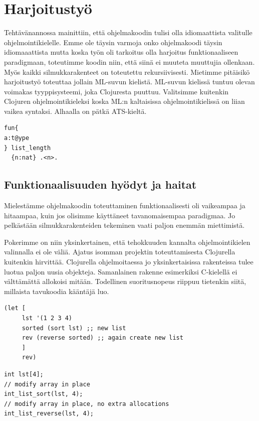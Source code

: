 \documentclass[12pt]{article}
\begin{document}
\newpage
\section{Harjoitustyö}
Tehtävänannossa mainittiin, että ohjelmakoodin tulisi olla idiomaattista valitulle ohjelmointikielelle.
Emme ole täysin varmoja onko ohjelmakoodi täysin idiomaaattista mutta koska työn oli tarkoitus olla harjoitus funktionaaliseen paradigmaan,
toteutimme koodin niin, että siinä ei muuteta muuttujia ollenkaan. Myös kaikki silmukkarakenteet on toteutettu rekursiivisesti.
Mietimme pitäisikö harjoitustyö toteuttaa jollain ML-suvun kielistä. ML-suvun kielissä tuntuu olevan voimakas tyyppisysteemi, joka Clojuresta puuttuu. Valitsimme kuitenkin Clojuren ohjelmointikieleksi koska ML:n kaltaisissa ohjelmointikielissä on liian vaikea syntaksi. Alhaalla on pätkä ATS-kieltä.

\begin{lstlisting}
fun{
a:t@ype
} list_length
  {n:nat} .<n>.
\end{lstlisting}

\subsection{Funktionaalisuuden hyödyt ja haitat}
Mielestämme ohjelmakoodin toteuttaminen funktionaalisesti oli vaikeampaa ja hitaampaa, kuin jos olisimme käyttäneet tavanomaisempaa
paradigmaa. Jo pelkästään silmukkarakenteiden tekeminen vaati paljon enemmän miettimistä. 


Pokerimme on niin yksinkertainen, että tehokkuuden kannalta ohjelmointikielen valinnalla ei ole väliä.
Ajatus isomman projektin toteuttamisesta Clojurella kuitenkin hirvittää. Clojurella ohjelmoitaessa jo yksinkertaisissa rakenteissa tulee luotua paljon uusia objekteja. Samanlainen rakenne esimerkiksi C-kielellä ei välttämättä allokoisi mitään.
Todellinen suoritusnopeus riippuu tietenkin siitä, millaista tavukoodia kääntäjä luo.

\newpage
\begin{lstlisting}
(let [
     lst '(1 2 3 4)
     sorted (sort lst) ;; new list
     rev (reverse sorted) ;; again create new list 
     ]
     rev)
\end{lstlisting}

\begin{lstlisting}
int lst[4];
// modify array in place
int_list_sort(lst, 4); 
// modify array in place, no extra allocations
int_list_reverse(lst, 4); 
\end{lstlisting}
\end{document}

